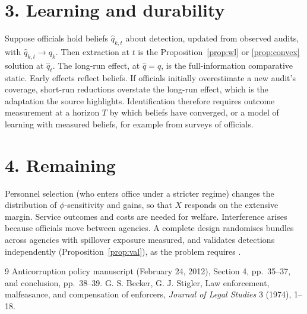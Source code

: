 \documentclass[11pt]{article}
\theoremstyle{definition}
\begin{document}
\section*{3. Learning and durability}
Suppose officials hold beliefs $\hat q_{k,t}$ about detection, updated from observed audits, with
$\hat q_{k,t}\to q_k$. Then extraction at $t$ is the Proposition~\ref{prop:wl} or \ref{prop:convex} solution at $\hat q_t$. The
long-run effect, at $\hat q=q$, is the full-information comparative static. Early effects reflect beliefs. If officials
initially overestimate a new audit's coverage, short-run reductions overstate the long-run effect, which is the adaptation
the source highlights. Identification therefore requires outcome measurement at a horizon $T$ by which beliefs have
converged, or a model of learning with measured beliefs, for example from surveys of officials.

\section*{4. Remaining}
Personnel selection (who enters office under a stricter regime) changes the distribution of $\phi$-sensitivity and gains,
so that $X$ responds on the extensive margin. Service outcomes and costs are needed for welfare. Interference arises because
officials move between agencies. A complete design randomises bundles across agencies with spillover exposure measured, and
validates detections independently (Proposition~\ref{prop:val}), as the problem requires \cite{ol}.

\begin{thebibliography}{9}
 Anticorruption policy manuscript (February 24, 2012), Section 4, pp.~35--37, and conclusion, pp.~38--39.
 G. S. Becker, G. J. Stigler, Law enforcement, malfeasance, and compensation of enforcers, \emph{Journal of Legal Studies} 3 (1974), 1--18.
\end{thebibliography}
\end{document}

